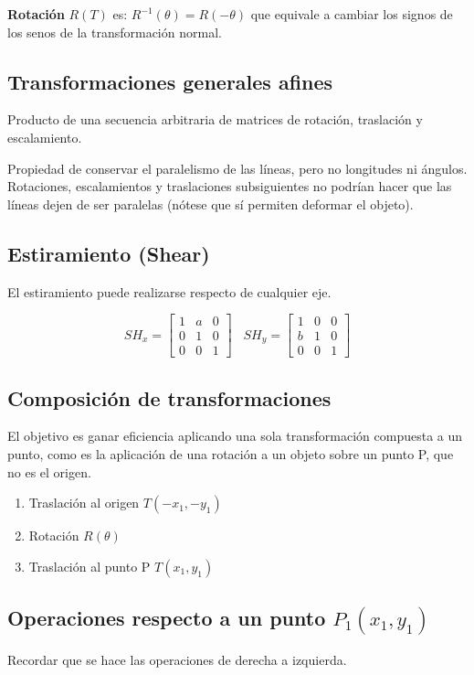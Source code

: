 \textbf{Rotación} $R(T)$ es: $R^{-1}(\theta) = R(-\theta)$ que equivale a cambiar los signos de los senos de la transformación normal.

\subsection{Transformaciones generales afines}
Producto de una secuencia arbitraria de matrices de rotación, traslación y escalamiento.

Propiedad de conservar el paralelismo de las líneas, pero no longitudes ni ángulos. Rotaciones, escalamientos y traslaciones subsiguientes no podrían hacer que las líneas dejen de ser paralelas (nótese que sí permiten deformar el objeto).

\subsection{Estiramiento (Shear)}
El estiramiento puede realizarse respecto de cualquier eje.

$$SH_x = \left[\begin{matrix}
1 & a & 0 \\ 0 & 1 & 0 \\ 0 & 0 & 1
\end{matrix}\right] \;\;\;
SH_y = \left[\begin{matrix}
1 & 0 & 0 \\ b & 1 & 0 \\ 0 & 0 & 1
\end{matrix}\right]$$

\subsection{Composición de transformaciones}
El objetivo es ganar eficiencia aplicando una sola transformación compuesta a un punto, como es la aplicación de una rotación a un objeto sobre un punto P, que no es el origen.
\begin{enumerate}
    \item Traslación al origen $T(-x_1, -y_1)$
    \item Rotación $R(\theta)$
    \item Traslación al punto P $T(x_1, y_1)$
\end{enumerate}

\subsection{Operaciones respecto a un punto $P_1(x_1,y_1)$}
Recordar que se hace las operaciones de derecha a izquierda.

